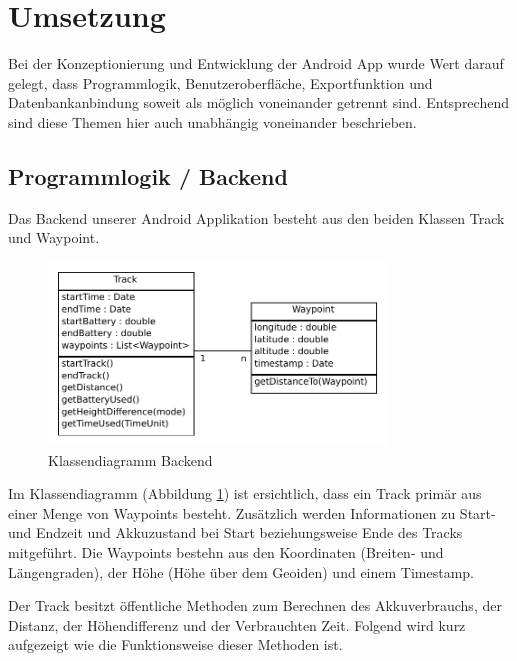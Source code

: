 \clearpage
\section{Umsetzung}
Bei der Konzeptionierung und Entwicklung der Android App wurde Wert darauf gelegt, dass Programmlogik, Benutzeroberfläche, Exportfunktion und Datenbankanbindung soweit als möglich voneinander getrennt sind. Entsprechend sind diese Themen hier auch unabhängig voneinander beschrieben.

\subsection{Programmlogik / Backend}
\label{subsec:programmlogikbackend}
Das Backend unserer Android Applikation besteht aus den beiden Klassen Track und Waypoint. 

\begin{figure}[h]
  \centering
  \includegraphics[width=0.8\textwidth]{images/classdiag_backend.pdf}
  \caption[Klassendiagramm Backend]{Klassendiagramm Backend}
  \label{fig:classdiag_backend}
\end{figure}

Im Klassendiagramm (Abbildung \ref{fig:classdiag_backend}) ist ersichtlich, dass ein Track primär aus einer Menge von Waypoints besteht. Zusätzlich werden Informationen zu Start- und Endzeit und Akkuzustand bei Start beziehungsweise Ende des Tracks mitgeführt. Die Waypoints bestehn aus den Koordinaten (Breiten- und Längengraden), der Höhe (Höhe über dem Geoiden) und einem Timestamp.

Der Track besitzt öffentliche Methoden zum Berechnen des Akkuverbrauchs, der Distanz, der Höhendifferenz und der Verbrauchten Zeit. Folgend wird kurz aufgezeigt wie die Funktionsweise dieser Methoden ist.


